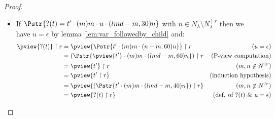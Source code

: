 \begin{proof}
\begin{itemize}
\item If $\Pstr{ ?(t) =  t' \cdot (m){m} \cdot  u \cdot (lmd-m,30){n}}$ with $n\in N_\lambda \setminus N^{\upharpoonright r}_\lambda$ then we have $u = \epsilon$ by lemma
    \ref{lem:var_followedby_child} and:
        \begin{align*}
        \pview{?(t)} \upharpoonright  r
        &= \pview{\Pstr{t' \cdot (m){m} \cdot (n-m,60){n}}} \upharpoonright  r
                                                        & (u=\epsilon)\\
        &= (\Pstr{\pview{t'} \cdot (m){m} \cdot (lmd-m,60){n}} ) \upharpoonright  r
                                                        & (\mbox{P-view computation}) \\
        &= \pview{t'} \upharpoonright  r                & (m, n \not\in N^{\upharpoonright r}) \\
        &= \pview{t' \upharpoonright  r }               & \mbox{(induction hypothesis)} \\
        &= \pview{ (\Pstr{t' \cdot (m){m} \cdot (lmd-m,40){n}}) \upharpoonright r }
                                                        & (m, n \not\in N^{\upharpoonright r}) \\
        &= \pview{ ?(t) \upharpoonright r }             & \mbox{(def. of $?(t)$ \& $u = \epsilon$)}
        \end{align*}


\end{itemize}
\end{proof}
